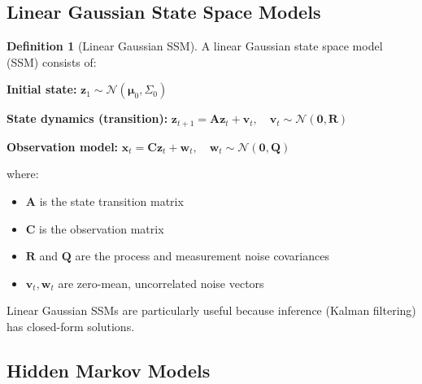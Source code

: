 \documentclass[12pt,a4paper]{article}
\theoremstyle{definition}
\newtheorem{definition}{Definition}[section]
\begin{document}
\subsection{Linear Gaussian State Space Models}

\begin{definition}[Linear Gaussian SSM]
A linear Gaussian state space model (SSM) consists of:

\textbf{Initial state:} $\mathbf{z}_1 \sim \mathcal{N}(\boldsymbol{\mu}_0, \Sigma_0)$

\textbf{State dynamics (transition):} $\mathbf{z}_{t+1} = \mathbf{A} \mathbf{z}_t + \mathbf{v}_t, \quad \mathbf{v}_t \sim \mathcal{N}(\mathbf{0}, \mathbf{R})$

\textbf{Observation model:} $\mathbf{x}_t = \mathbf{C} \mathbf{z}_t + \mathbf{w}_t, \quad \mathbf{w}_t \sim \mathcal{N}(\mathbf{0}, \mathbf{Q})$

where:
\begin{itemize}
    \item $\mathbf{A}$ is the state transition matrix
    \item $\mathbf{C}$ is the observation matrix
    \item $\mathbf{R}$ and $\mathbf{Q}$ are the process and measurement noise covariances
    \item $\mathbf{v}_t, \mathbf{w}_t$ are zero-mean, uncorrelated noise vectors
\end{itemize}

Linear Gaussian SSMs are particularly useful because inference (Kalman filtering) has closed-form solutions.
\end{definition}

\subsection{Hidden Markov Models}
\end{document}
